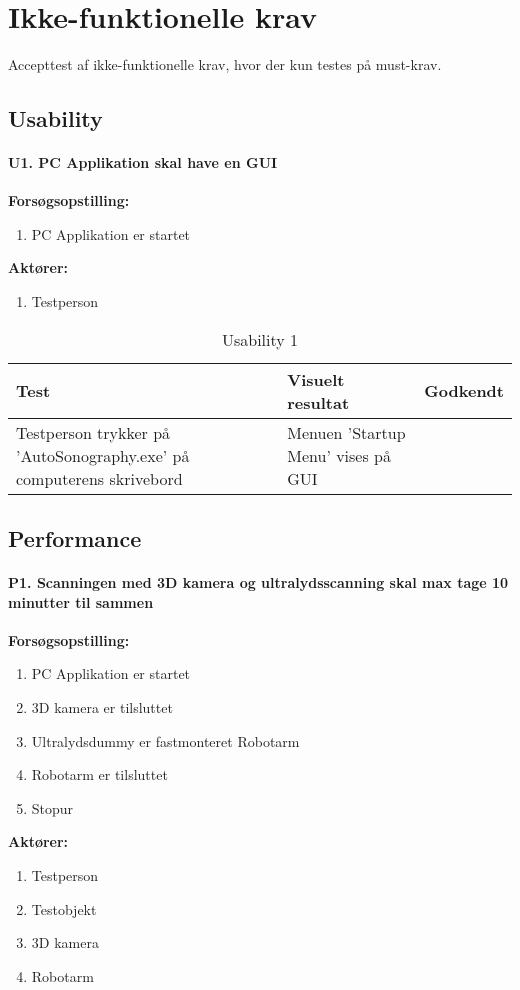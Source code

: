 \chapter{Ikke-funktionelle krav}\label{Ikkefunktionellekrav}
Accepttest af ikke-funktionelle krav, hvor der kun testes på must-krav. 

\section{Usability}
\subsubsection{U1. PC Applikation skal have en GUI}
\textbf{Forsøgsopstilling:}
\begin{enumerate}
\item PC Applikation er startet 
\end{enumerate}
\textbf{Aktører:}
\begin{enumerate}
\item Testperson
\end{enumerate} 

\begin{table}[htb]
\begin{tabularx}{\textwidth}{|X|X|p{2cm}|}
\hline
\textbf{Test} & \textbf{Visuelt resultat} &\textbf{Godkendt}\\\hline    
Testperson trykker på 'AutoSonography.exe' på computerens skrivebord & Menuen 'Startup Menu' vises på GUI &\\\hline
\end{tabularx}
\caption{Usability 1}
\label{U1}
\end{table}

\newpage

\section{Performance}
\subsubsection{P1. Scanningen med 3D kamera og ultralydsscanning skal max tage 10 minutter til sammen}
\textbf{Forsøgsopstilling:}
\begin{enumerate}
\item PC Applikation er startet
\item 3D kamera er tilsluttet
\item Ultralydsdummy er fastmonteret Robotarm
\item Robotarm er tilsluttet
\item Stopur
\end{enumerate}
\textbf{Aktører:}
\begin{enumerate}
\item Testperson
\item Testobjekt
\item 3D kamera 
\item Robotarm
\end{enumerate}

